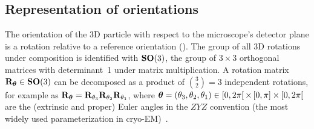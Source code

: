 \subsection{Representation of orientations}\label{sec:method:orientation-representation}

The orientation of the 3D particle with respect to the microscope's detector plane is a rotation relative to a reference orientation ().
The group of all 3D rotations under composition is identified with $\mathrm{\mathbf{SO}}(3)$, the group of $3 \times 3$ orthogonal matrices with determinant~1 under matrix multiplication.
A rotation matrix $\mathbf{R}_{{\boldsymbol{\theta}}} \in \mathrm{\mathbf{SO}}(3)$ can be decomposed as a product of $\binom{3}{2}=3$ independent rotations, for example as $\mathbf{R}_{{\boldsymbol{\theta}}} = \mathbf{R}_{\theta_3} \mathbf{R}_{\theta_2} \mathbf{R}_{\theta_1}$, where ${\boldsymbol{\theta}} = (\theta_3,\theta_2,\theta_1) \in [0,2\pi[ \, \times \, [0,\pi] \times [0,2\pi[$ are the (extrinsic and proper) Euler angles in the $ZYZ$ convention (the most widely used parameterization in cryo-EM)~\cite{sorzano2014interchanging}.

